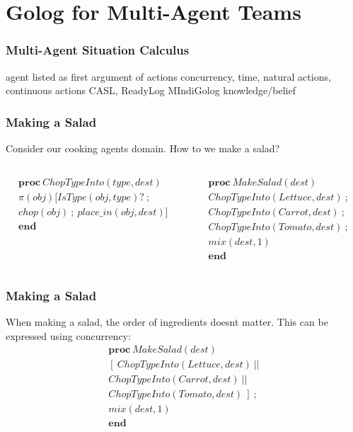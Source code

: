 \documentclass{beamer}
\begin{document}
\section{Golog for Multi-Agent Teams}

\begin{frame}
\frametitle{Multi-Agent Situation Calculus}
agent listed as first argument of actions
concurrency, time, natural actions, continuous actions
CASL, ReadyLog
MIndiGolog
knowledge/belief
\end{frame}

\begin{frame}
\frametitle{Making a Salad}
Consider our cooking agents domain.  How to we make a salad?
\ \\
\begin{columns}
  \begin{column}{0.5\textwidth}
\[
\begin{array}{c}
\mathbf{proc}\ ChopTypeInto(type,dest)\\
\pi(obj)[IsType(obj,type)?\ ;\\
chop(obj)\ ;\ place\_in(obj,dest)]\\
\mathbf{end}\end{array}\]
  \end{column}
  \begin{column}{0.5\textwidth}
\[
\begin{array}{c}
\mathbf{proc}\ MakeSalad(dest)\\
ChopTypeInto(Lettuce,dest)\ ;\\
ChopTypeInto(Carrot,dest)\ ;\\
ChopTypeInto(Tomato,dest)\ ;\\
mix(dest,1)\\
\mathbf{end}\end{array}\]
  \end{column}
\end{columns}

\end{frame}

\begin{frame}
\frametitle{Making a Salad}
When making a salad, the order of ingredients doesnt matter.  This can
be expressed using concurrency:\[
\begin{array}{c}
\mathbf{proc}\ MakeSalad(dest)\\
\left[\ ChopTypeInto(Lettuce,dest)\ ||\right.\\
ChopTypeInto(Carrot,dest)\ ||\\
\left.ChopTypeInto(Tomato,dest)\ \right]\ ;\\
mix(dest,1)\\
\mathbf{end}\end{array}\]
\end{frame}
\end{document}
